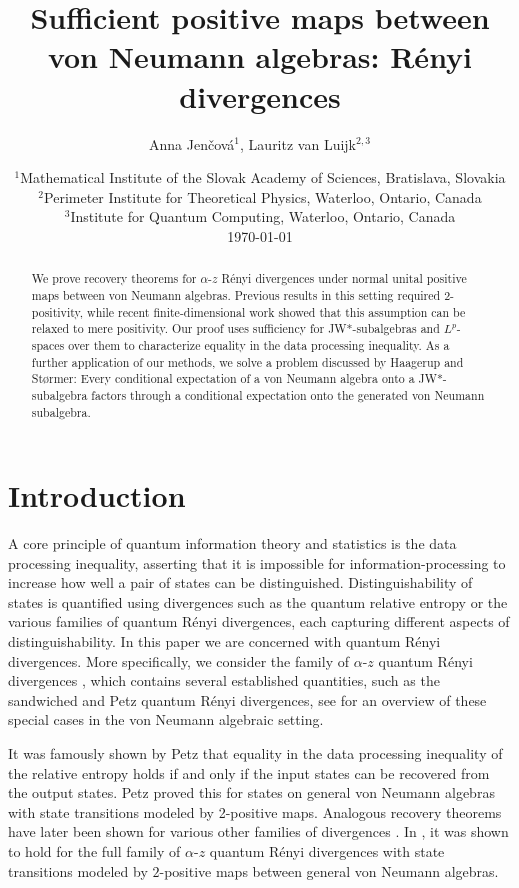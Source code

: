 \documentclass[12pt]{article}
\title{Sufficient positive maps between von Neumann algebras: R{\'e}nyi divergences}
\author{Anna Jen\v cov\'a$^1$, Lauritz van Luijk$^{2,3}$}
\date{\footnotesize{
$^1$Mathematical Institute of the Slovak Academy of Sciences, Bratislava, Slovakia\\
$^2$Perimeter Institute for Theoretical Physics, Waterloo, Ontario, Canada\\
$^3$Institute for Quantum Computing, Waterloo, Ontario, Canada\\
\today}}
\theoremstyle{definition}
\theoremstyle{remark}
\begin{document}
\maketitle

\begin{abstract}
We prove recovery theorems for $\alpha$-$z$ R\'enyi divergences under normal unital positive maps between von Neumann algebras. 
Previous results in this setting required 2-positivity, while recent finite-dimensional work showed that this assumption can be relaxed to mere positivity. Our proof uses sufficiency for JW*-subalgebras and $L^p$-spaces over them to characterize equality in the data processing inequality. 
As a further application of our methods, we solve a problem discussed by Haagerup and Størmer: Every conditional expectation of a von Neumann algebra onto a JW*-subalgebra factors through a conditional expectation onto the generated von Neumann subalgebra.
\end{abstract}

\tableofcontents

\null 



\section{Introduction}

A core principle of quantum information theory and statistics is the data processing inequality, asserting that it is impossible for information-processing to increase how well a pair of states can be distinguished.
Distinguishability of states is quantified using divergences such as the quantum relative entropy or the various families of quantum R\'enyi divergences, each capturing different aspects of distinguishability.
In this paper we are concerned with quantum R\'enyi divergences.
More specifically, we consider the family of $\alpha$-$z$ quantum R\'enyi divergences
\cite{audenaert_-z-renyi_2015,hiai2024alphaz,kato2024onrenyi}, which contains
several established quantities, such as the sandwiched and  Petz quantum R\'enyi
divergences, see \cite{hiai2021quantum} for an overview of these special cases in the von Neumann algebraic setting.

It was famously shown by Petz \cite{petz_sufficiency_1988} that equality in the data processing inequality of the relative entropy holds if and only if the input states can be recovered from the output states.
Petz proved this for states on general von Neumann algebras with state transitions modeled by 2-positive maps.
Analogous recovery theorems have later been shown for various other families of
divergences \cite{jencova_reversibility_2012,jencova2017preservation,hiai2017different}.
In \cite{hiai2024alphaz}, it was shown to hold for the full family of $\alpha$-$z$ quantum R\'enyi divergences with state transitions modeled by $2$-positive maps between general von Neumann algebras. 
\end{document}
